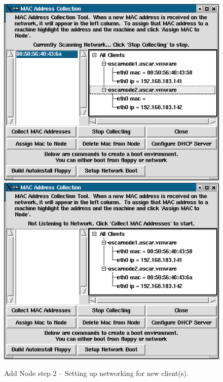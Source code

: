 \begin{figure}[h!]
  \begin{center}
    \centerline{
      \includegraphics[scale=\imgscale]{figs/9d_sbs-add-node-mac1}
      \hspace{\imghskip}
      \includegraphics[scale=\imgscale]{figs/9e_sbs-add-node-mac2}
      }
    \caption{Add Node step 2 -- Setting up networking for new client(s).}
    \label{fig:sbs-add-node1-setup-network}
  \end{center}
\end{figure}


